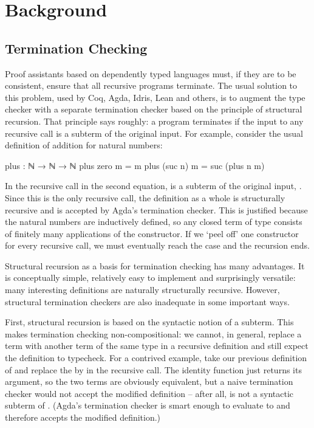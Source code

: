 \chapter{Background}
\label{sec:background}


\section{Termination Checking}
\label{sec:background:termination}

Proof assistants based on dependently typed languages must, if they are to be
consistent, ensure that all recursive programs terminate. The usual solution to
this problem, used by Coq, Agda, Idris, Lean and others, is to augment the type
checker with a separate termination checker based on the principle of structural
recursion. That principle says roughly: a program terminates if the input to any
recursive call is a subterm of the original input. For example, consider the
usual definition of addition for natural numbers:
\begin{code}
  plus : ℕ → ℕ → ℕ
  plus zero    m = m
  plus (suc n) m = suc (plus n m)
\end{code}

In the recursive call in the second equation,  is a subterm of the
original input, . Since this is the only recursive call, the
definition as a whole is structurally recursive and is accepted by Agda's
termination checker. This is justified because the natural numbers are
inductively defined, so any closed term of type  consists of finitely
many applications of the  constructor. If we \enquote*{peel off} one
constructor for every recursive call, we must eventually reach the 
case and the recursion ends.

Structural recursion as a basis for termination checking has many advantages. It
is conceptually simple, relatively easy to implement and surprisingly versatile:
many interesting definitions are naturally structurally recursive. However,
structural termination checkers are also inadequate in some important ways.

First, structural recursion is based on the syntactic notion of a subterm. This
makes termination checking non-compositional: we cannot, in general, replace a
term with another term of the same type in a recursive definition and still
expect the definition to typecheck. For a contrived example, take our previous
definition of  and replace the  by  in the
recursive call. The identity function  just returns its argument, so
the two terms are obviously equivalent, but a naive termination checker would
not accept the modified definition -- after all,  is not a syntactic
subterm of . (Agda's termination checker is smart enough to
evaluate  to  and therefore accepts the modified
definition.)

